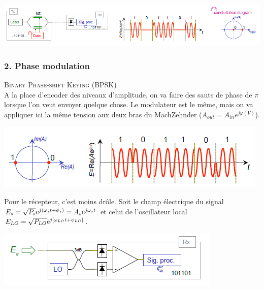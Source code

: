 \begin{center}
	\includegraphics[scale=0.65]{ch6/image38}
\end{center}

\subsubsection{2. Phase modulation}
\textsc{Binary Phase-shift Keying (BPSK)}\\
A la place d'encoder des niveaux d'amplitude, on va faire des sauts de phase de $\pi$ lorsque
l'on veut envoyer quelque chose. Le modulateur est le même, mais on va appliquer ici la même
tension aux deux bras du MachZehnder (${A_{out}} = {A_{in}}{e^{j\varphi (V)}}$).
\begin{center}
	\includegraphics[scale=0.65]{ch6/image39}
\end{center}
\newpage
Pour le récepteur, c'est moins drôle. Soit le champ électrique du signal ${E_s} = \sqrt {{P_s}} {{\mathop{\rm e}\nolimits} ^{j({\omega _s}t + {\phi _s})}} = {A_s}{{\mathop{\rm e}\nolimits} ^{j{\omega _s}t}}$ et celui de l'oscillateur local ${E_{LO}} = \sqrt {{P_{LO}}} {{\mathop{\rm e}\nolimits} ^{j[{\omega _{LO}}t + {\phi _{LO}}]}}$.
\begin{center}
	\includegraphics[scale=0.65]{ch6/image40}
\end{center}


